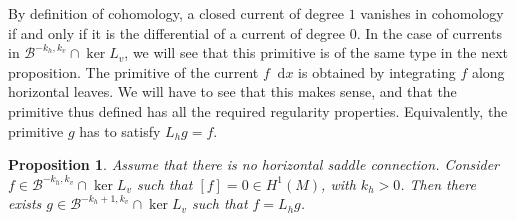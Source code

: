 \documentclass[11pt, a4paper, oneside, final, pagebackref]{amsart}
\newcommand{\boB}{\mathcal{B}}
\newcommand{\dd}{\mathop{}\!\mathrm{d}}
\newtheorem{prop}[thm]{Proposition}
\theoremstyle{definition}
\numberwithin{equation}{section}
\begin{document}
By definition of cohomology, a closed current of degree $1$ vanishes in
cohomology if and only if it is the differential of a current of degree $0$.
In the case of currents in $\boB^{-k_h, k_v} \cap \ker L_v$, we will see that
this primitive is of the same type in the next proposition. The primitive of
the current $f \dd x$ is obtained by integrating $f$ along horizontal leaves.
We will have to see that this makes sense, and that the primitive thus
defined has all the required regularity properties. Equivalently, the
primitive $g$ has to satisfy $L_h g = f$.

\begin{prop}
\label{prop:integre_Lu} Assume that there is no horizontal saddle connection.
Consider $f \in \boB^{-k_h, k_v} \cap \ker L_v$ such that $[f] = 0 \in
H^1(M)$, with $k_h>0$. Then there exists $g \in \boB^{-k_h+1, k_v} \cap \ker
L_v$ such that $f = L_h g$.
\end{prop}
\end{document}
